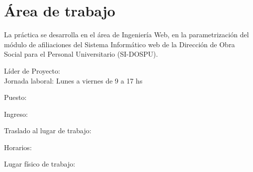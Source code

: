 \section{Área de trabajo}
La práctica se desarrolla en el área de Ingeniería Web, en la parametrización del módulo de afiliaciones del Sistema Informático web de la Dirección de Obra Social para el Personal Universitario (SI-DOSPU).

Líder de Proyecto: \\ %

Jornada laboral: Lunes a viernes de 9 a 17 hs

Puesto: %

Ingreso: %

Traslado al lugar de trabajo: %

Horarios: %

Lugar físico de trabajo: %
